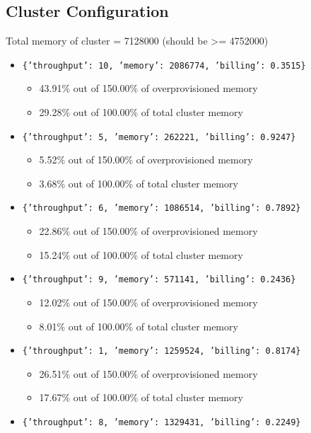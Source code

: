 \documentclass[]{interact}
\theoremstyle{plain}
\theoremstyle{definition}
\theoremstyle{remark}
\begin{document}
\subsection{Cluster Configuration}
Total memory of cluster = 7128000 (should be >= 4752000)
\begin{itemize}
    \item \texttt{\{'throughput': 10, 'memory': 2086774, 'billing': 0.3515\}}
    \begin{itemize}
        \item 43.91\% out of 150.00\% of overprovisioned memory
        \item 29.28\% out of 100.00\% of total cluster memory
    \end{itemize}
    \item \texttt{\{'throughput': 5, 'memory': 262221, 'billing': 0.9247\}}
    \begin{itemize}
        \item 5.52\% out of 150.00\% of overprovisioned memory
        \item 3.68\% out of 100.00\% of total cluster memory
    \end{itemize}
    \item \texttt{\{'throughput': 6, 'memory': 1086514, 'billing': 0.7892\}}
    \begin{itemize}
        \item 22.86\% out of 150.00\% of overprovisioned memory
        \item 15.24\% out of 100.00\% of total cluster memory
    \end{itemize}
    \item \texttt{\{'throughput': 9, 'memory': 571141, 'billing': 0.2436\}}
    \begin{itemize}
        \item 12.02\% out of 150.00\% of overprovisioned memory
        \item 8.01\% out of 100.00\% of total cluster memory
    \end{itemize}
    \item \texttt{\{'throughput': 1, 'memory': 1259524, 'billing': 0.8174\}}
    \begin{itemize}
        \item 26.51\% out of 150.00\% of overprovisioned memory
        \item 17.67\% out of 100.00\% of total cluster memory
    \end{itemize}
    \item \texttt{\{'throughput': 8, 'memory': 1329431, 'billing': 0.2249\}}

\end{itemize}
\end{document}
